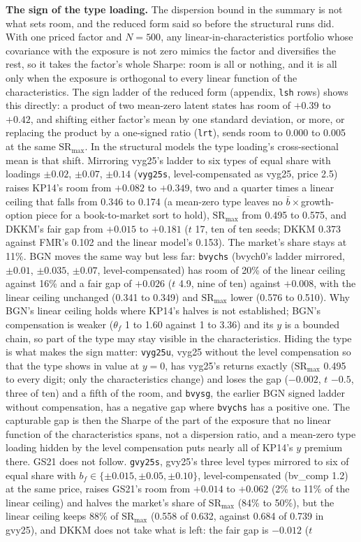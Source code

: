 \noindent\textbf{The sign of the type loading.} The dispersion bound in the summary is not what sets room, and the reduced form said so before the structural runs did. With one priced factor and $N=500$, any linear-in-characteristics portfolio whose covariance with the exposure is not zero mimics the factor and diversifies the rest, so it takes the factor's whole Sharpe: room is all or nothing, and it is all only when the exposure is orthogonal to every linear function of the characteristics. The sign ladder of the reduced form (appendix, \texttt{lsh} rows) shows this directly: a product of two mean-zero latent states has room of $+0.39$ to $+0.42$, and shifting either factor's mean by one standard deviation, or more, or replacing the product by a one-signed ratio (\texttt{lrt}), sends room to 0.000 to 0.005 at the same $\mathrm{SR}_{\max}$. In the structural models the type loading's cross-sectional mean is that shift. Mirroring vyg25's ladder to six types of equal share with loadings $\pm0.02$, $\pm0.07$, $\pm0.14$ (\texttt{vyg25s}, level-compensated as vyg25, price 2.5) raises KP14's room from $+0.082$ to $+0.349$, two and a quarter times a linear ceiling that falls from 0.346 to 0.174 (a mean-zero type leaves no $\bar b\times$growth-option piece for a book-to-market sort to hold), $\mathrm{SR}_{\max}$ from 0.495 to 0.575, and DKKM's fair gap from $+0.015$ to $+0.181$ ($t$ 17, ten of ten seeds; DKKM 0.373 against FMR's 0.102 and the linear model's 0.153). The market's share stays at 11\%. BGN moves the same way but less far: \texttt{bvychs} (bvych0's ladder mirrored, $\pm0.01$, $\pm0.035$, $\pm0.07$, level-compensated) has room of 20\% of the linear ceiling against 16\% and a fair gap of $+0.026$ ($t$ 4.9, nine of ten) against $+0.008$, with the linear ceiling unchanged (0.341 to 0.349) and $\mathrm{SR}_{\max}$ lower (0.576 to 0.510). Why BGN's linear ceiling holds where KP14's halves is not established; BGN's compensation is weaker ($\theta_f$ 1 to 1.60 against 1 to 3.36) and its $y$ is a bounded chain, so part of the type may stay visible in the characteristics. Hiding the type is what makes the sign matter: \texttt{vyg25u}, vyg25 without the level compensation so that the type shows in value at $y=0$, has vyg25's returns exactly ($\mathrm{SR}_{\max}$ 0.495 to every digit; only the characteristics change) and loses the gap ($-0.002$, $t$ $-0.5$, three of ten) and a fifth of the room, and \texttt{bvysg}, the earlier BGN signed ladder without compensation, has a negative gap where \texttt{bvychs} has a positive one. The capturable gap is then the Sharpe of the part of the exposure that no linear function of the characteristics spans, not a dispersion ratio, and a mean-zero type loading hidden by the level compensation puts nearly all of KP14's $y$ premium there. GS21 does not follow. \texttt{gvy25s}, gvy25's three level types mirrored to six of equal share with $b_f\in\{\pm0.015,\pm0.05,\pm0.10\}$, level-compensated (bv\_comp 1.2) at the same price, raises GS21's room from $+0.014$ to $+0.062$ (2\% to 11\% of the linear ceiling) and halves the market's share of $\mathrm{SR}_{\max}$ (84\% to 50\%), but the linear ceiling keeps 88\% of $\mathrm{SR}_{\max}$ (0.558 of 0.632, against 0.684 of 0.739 in gvy25), and DKKM does not take what is left: the fair gap is $-0.012$ ($t$ 